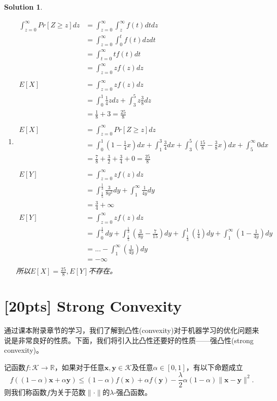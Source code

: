 \documentclass[a4paper,UTF8]{article}
\numberwithin{equation}{section}
\newtheorem*{mySol}{Solution}
\begin{document}
\begin{mySol}
\begin{enumerate}[ {(}1{)}]
\item
\begin{eqnarray*}
	\int^{\infty}_{z=0}{Pr[Z \geq z]dz} 
		&= \int^{\infty}_{z=0}\int^{\infty}_{z}{f(t)dtdz}\\
		&= \int^{\infty}_{z=0}\int^t_0{f(t)}dzdt\\
		&= \int^{\infty}_{t=0}{tf(t)}dt\\
		&= \int^{\infty}_{z=0}{zf(z)}dz\\
	\\	
	E[X]&=\int^{\infty}_{z=0}{zf(z)}dz\\
		&=\int^{1}_{0}{\frac14 z}dz +\int^{5}_{3}{z\frac38}dz\\
		&=\frac{1}{8} + 3 = \frac{25}{8}\\	
	\\
	E[X]&=\int^{\infty}_{z=0}{Pr[Z \geq z]dz} \\
		&=\int^{1}_{0}{(1-\frac{1}{4}x)dx}
		+\int^{3}_{1}{\frac{3}{4}dx}
		+\int^{5}_{3}{(\frac{15}{8}-\frac{3}{8}x)dx}
		+\int^{\infty}_{5}{0dx}\\
		&=\frac{7}{8}+\frac{3}{2}+\frac{3}{4}+0
		=\frac{25}{8}\\
	\\
	E[Y]&=\int^{\infty}_{z=0}{zf(z)}dz\\
		&=\int^{\frac{1}{3}}_{\frac{1}{5}}{\frac{3}{8y^2}}dy 
		+\int^{\infty}_{1}{\frac{1}{4y} dy}\\
		&=\frac{3}{4}+ \infty
	\\
	E[Y]&=\int^{\infty}_{z=0}{zf(z)}dz\\
		&=\int^{\frac{1}{5}}_{0}{dy}
		+\int^{\frac{1}{3}}_{\frac{1}{5}}{(\frac{3}{8y}-\frac{7}{15})dy}
		+\int^{1}_{\frac{1}{3}}{(\frac{1}{4})dy}
		+\int^{\infty}_{1}{(1-\frac{1}{4y})dy}\\
		&=...-\int^{\infty}_{1}{(\frac{1}{4y})dy}\\
		&=-\infty\\
\end{eqnarray*}
	所以$E[X]=\frac{25}{8},E[Y]$不存在。
\end{enumerate}

\end{mySol}

\newpage

\section{[20pts] Strong Convexity}
通过课本附录章节的学习，我们了解到凸性(convexity)对于机器学习的优化问题来说是非常良好的性质。下面，我们将引入比凸性还要好的性质——强凸性(strong convexity)。
\begin{def-box}[强凸性]
记函数$f: \mathcal{K} \rightarrow \mathbb{R}$，如果对于任意$\mathbf{x}, \mathbf{y} \in \mathcal{K}$及任意$\alpha\in[0,1]$，有以下命题成立
\begin{equation}
  \label{eq-sc-1}
  f((1-\alpha)\mathbf{x} + \alpha\mathbf{y})\leq (1-\alpha)f(\mathbf{x}) + \alpha f(\mathbf{y}) - \frac{\lambda}{2}\alpha(1-\alpha)\lVert \mathbf{x} - \mathbf{y}\rVert^2.
\end{equation}
则我们称函数$f$为关于范数$\lVert \cdot \rVert$的$\lambda$-强凸函数。
\end{def-box}
\end{document}
